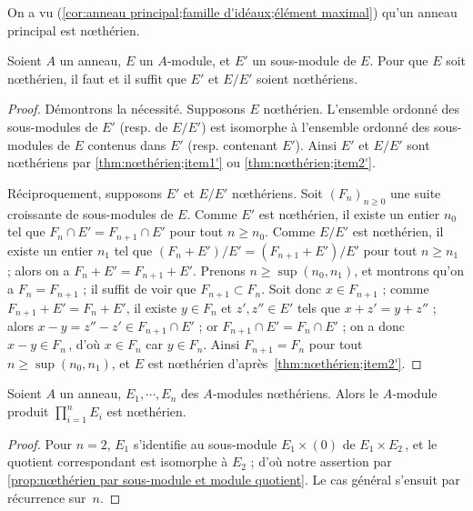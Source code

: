 \documentclass[11pt, useosf,
  title in boldface,
  theorem in new line,
  theorem numbering = section,
  number theorems separately,
]{simplivre}
\begin{document}
    On a vu (\cref{cor:anneau principal;famille d'idéaux;élément maximal}) qu'un anneau principal est nœthérien.

    \begin{proposition}\label{prop:nœthérien par sous-module et module quotient}
        Soient \( A \) un anneau, \( E \) un \( A \)‑module, et \( E' \) un sous-module de \( E \). Pour que \( E \) soit nœthérien, il faut et il suffit que \( E' \) et \( E/E' \) soient nœthériens.
    \end{proposition}
    \begin{proof}
        Démontrons la nécessité. Supposons \( E \) nœthérien. L'ensemble ordonné des sous-modules de \( E' \) (resp. de \( E/E' \)) est isomorphe à l'ensemble ordonné des sous-modules de \( E \) contenus dans \( E' \) (resp. contenant \( E' \)). Ainsi \( E' \) et \( E/E' \) sont nœthériens par \ref{thm:nœthérien;item1'} ou \ref{thm:nœthérien;item2'}.

        Réciproquement, supposons \( E' \) et \( E/E' \) nœthériens. Soit \( (F_n)_{n \geqslant 0} \) une suite croissante de sous-modules de \( E \). Comme \( E' \) est nœthérien, il existe un entier \( n_0 \) tel que \( F_n \cap E' = F_{n+1} \cap E' \) pour tout \( n \geqslant n_0 \). Comme \( E/E' \) est nœthérien, il existe un entier \( n_1 \) tel que \( (F_n+E')/E' = (F_{n+1}+E')/E' \) pour tout \( n \geqslant n_1 \) ; alors on a \( F_n+E' = F_{n+1}+E' \). Prenons \( n \geqslant \sup(n_0,n_1) \), et montrons qu'on a \( F_n = F_{n+1} \) ; il suffit de voir que \( F_{n+1} \subset F_n \). Soit donc \( x \in F_{n+1} \) ; comme \( F_{n+1} + E' = F_n + E' \), il existe \( y \in F_n \) et \( z', z'' \in E' \) tels que \( x+z' = y+z'' \) ; alors \( x-y = z''-z' \in F_{n+1} \cap E' \) ; or \( F_{n+1} \cap E' = F_n \cap E' \) ; on a donc \( x-y \in F_n \)\,, d'où \( x \in F_n \) car \( y \in F_n \). Ainsi \( F_{n+1} = F_n \) pour tout \( n \geqslant \sup(n_0,n_1) \), et \( E \) est nœthérien d'après~\ref{thm:nœthérien;item2'}.
    \end{proof}

    \begin{corollary}\label{cor:module de type fini sur un anneau nœthérien}
        Soient \( A \) un anneau, \( E_1, \cdots, E_n \) des \( A \)‑modules nœthériens. Alors le \( A \)‑module produit \( \prod_{i=1}^n E_i \) est nœthérien.
    \end{corollary}
    \begin{proof}
        Pour \( n = 2 \), \( E_1 \) s'identifie au sous-module \( E_1 \times (0) \) de \( E_1 \times E_2 \)\,, et le quotient correspondant est isomorphe à \( E_2 \) ; d'où notre assertion par \cref{prop:nœthérien par sous-module et module quotient}. Le cas général s'ensuit par récurrence sur~\( n \).
    \end{proof}
\end{document}

